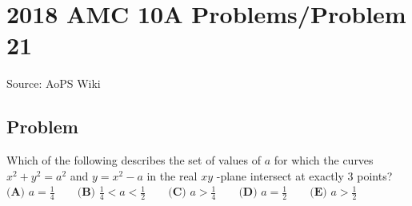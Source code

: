 \documentclass[12pt]{article}
\begin{document}
\section*{{2018 AMC 10A Problems/Problem 21}}
Source: AoPS Wiki

\subsection*{Problem}
Which of the following describes the set of values of $a$ for which the curves $x^2+y^2=a^2$ and $y=x^2-a$ in the real $xy$ -plane intersect at exactly $3$ points? $\textbf{(A) }a=\frac14 \qquad \textbf{(B) }\frac14 < a < \frac12 \qquad \textbf{(C) }a>\frac14 \qquad \textbf{(D) }a=\frac12 \qquad \textbf{(E) }a>\frac12 \qquad$
\end{document}
